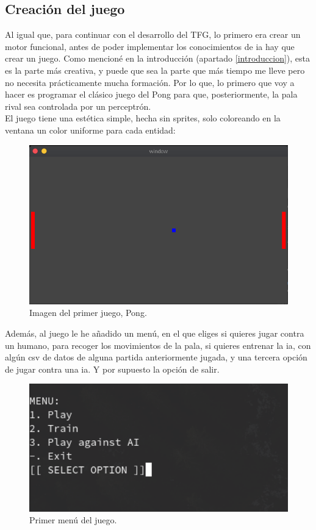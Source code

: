 \subsection{Creación del juego}
Al igual que, para continuar con el desarrollo del TFG, lo primero era crear un motor funcional, antes de poder implementar los conocimientos de \gls{ia} hay que crear un juego. Como mencioné en la introducción (apartado \ref{introduccion}), esta es la parte más creativa, y puede que sea la parte que más tiempo me lleve pero no necesita prácticamente mucha formación. Por lo que, lo primero que voy a hacer es programar el clásico juego del Pong para que, posteriormente, la pala rival sea controlada por un perceptrón. 
\\
El juego tiene una estética simple, hecha sin sprites, solo coloreando en la ventana un color uniforme para cada entidad:
\begin{figure}[H]
	\centering
	\includegraphics[width=15cm]{archivos/imagenes/pong.png}
	\caption{Imagen del primer juego, Pong.}
\end{figure}

Además, al juego le he añadido un menú, en el que eliges si quieres jugar contra un humano, para recoger los movimientos de la pala, si quieres entrenar la \gls{ia}, con algún \gls{csv} de datos de alguna partida anteriormente jugada, y una tercera opción de jugar contra una \gls{ia}. Y por supuesto la opción de salir.
\begin{figure}[H]
	\centering
	\includegraphics[width=15cm]{archivos/imagenes/menu-del-pong.png}
	\caption{Primer menú del juego.}
\end{figure}

